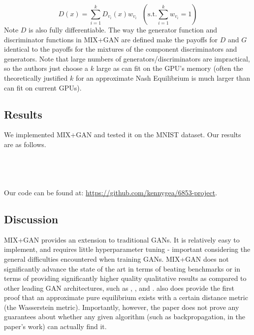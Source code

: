 \documentclass{article}
\begin{document}
\[
  D(x) = \sum\limits_{i = 1}^k D_{v_i}(x) w_{v_i} \mbox{  } (\mbox{s.t.} \sum\limits_{i=1}^k w_{v_i} = 1)
\]
Note $D$ is also fully differentiable. The way the generator function and discriminator functions in MIX+GAN are defined make the payoffs for $D$ and $G$ identical to the payoffs for the mixtures of the component discriminators and generators. Note that large numbers of generators/discriminators are impractical, so the authors just choose a $k$ large as can fit on the GPU's memory (often the theoretically justified $k$ for an approximate Nash Equilibrium is much larger than can fit on current GPUs).

\subsection{Results}
We implemented MIX+GAN and tested it on the MNIST dataset. Our results are as follows.
\\\\\\\\\\
Our code can be found at: \url{https://github.com/kennygea/6853-project}.
\subsection{Discussion}
MIX+GAN provides an extension to traditional GANs. It is relatively easy to implement, and requires little hyperparameter tuning - important considering the general difficulties encountered when training GANs. MIX+GAN does not significantly advance the state of the art in terms of beating benchmarks or in terms of providing significantly higher quality qualitative results as compared to other leading GAN architectures, such as \citet{DBLP:journals/corr/HuangLPHB16}, \citet{Salimans2016}, and \citet{DBLP:journals/corr/OdenaOS16}. \citet{Arora17} also does provide the first proof that an approximate pure equilibrium exists with a certain distance metric (the Wasserstein metric). Importantly, however, the paper does not prove any guarantees about whether any given algorithm (such as backpropagation, in the paper's work) can actually find it.


\end{document}
